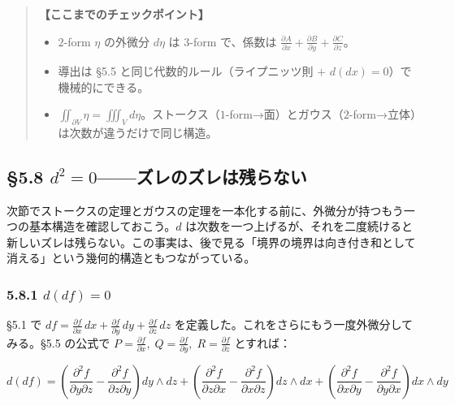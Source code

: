 \documentclass[a4paper,12pt,openany]{book}
\begin{document}
\begin{quote}
\textbf{【ここまでのチェックポイント】}

\begin{itemize}
\item
  \(2\)-form \(\eta\) の外微分 \(d\eta\) は \(3\)-form で、係数は
  \(\frac{\partial A}{\partial x} + \frac{\partial B}{\partial y} + \frac{\partial C}{\partial z}\)。
\item
  導出は §5.5 と同じ代数的ルール（ライプニッツ則 \(+\)
  \(d(dx)=0\)）で機械的にできる。
\item
  \(\iint_{\partial V} \eta = \iiint_V d\eta\)。ストークス（\(1\)-form→面）とガウス（\(2\)-form→立体）は次数が違うだけで同じ構造。
\end{itemize}
\end{quote}

\par\vspace{0.35em}\par

\hypertarget{d2-0ux30baux30ecux306eux30baux30ecux306fux6b8bux3089ux306aux3044}{%
\subsection{\texorpdfstring{§5.8
\(d^2 = 0\)——ズレのズレは残らない}{§5.8 d\^{}2 = 0——ズレのズレは残らない}}\label{d2-0ux30baux30ecux306eux30baux30ecux306fux6b8bux3089ux306aux3044}}

次節でストークスの定理とガウスの定理を一本化する前に、外微分が持つもう一つの基本構造を確認しておこう。\(d\)
は次数を一つ上げるが、それを二度続けると新しいズレは残らない。この事実は、後で見る「境界の境界は向き付き和として消える」という幾何的構造ともつながっている。

\hypertarget{ddf-0}{%
\subsubsection{\texorpdfstring{5.8.1
\(d(df) = 0\)}{5.8.1 d(df) = 0}}\label{ddf-0}}

§5.1 で
\(df = \frac{\partial f}{\partial x}\,dx + \frac{\partial f}{\partial y}\,dy + \frac{\partial f}{\partial z}\,dz\)
を定義した。これをさらにもう一度外微分してみる。§5.5 の公式で
\(P = \frac{\partial f}{\partial x},\; Q = \frac{\partial f}{\partial y},\; R = \frac{\partial f}{\partial z}\)
とすれば：

\[d(df) = \left(\frac{\partial^2 f}{\partial y \partial z} - \frac{\partial^2 f}{\partial z \partial y}\right) dy \wedge dz + \left(\frac{\partial^2 f}{\partial z \partial x} - \frac{\partial^2 f}{\partial x \partial z}\right) dz \wedge dx + \left(\frac{\partial^2 f}{\partial x \partial y} - \frac{\partial^2 f}{\partial y \partial x}\right) dx \wedge dy\]
\end{document}
